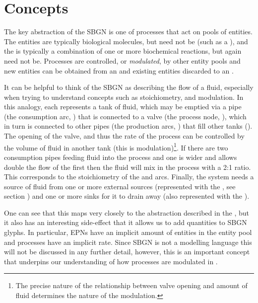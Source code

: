 \section{Concepts}
\label{sec:concepts}

The key abstraction of the SBGN \PDl is one of  processes that act on pools of entities. The entities are typically biological molecules, but need not be (such as a ), and the  is typically a combination of one or more  biochemical reactions, but again need not be.
Processes are controlled, or \emph{modulated}, by other entity pools and new entities can be obtained from an  and existing entities discarded to an .

It can be helpful to think of the SBGN \PD as describing the flow of a fluid, especially when trying to understand concepts such as stoichiometry, and modulation. In this analogy, each  represents a tank of fluid, which may be emptied via a pipe (the consumption arc, ) that is connected to a valve (the process node, ), which in turn is connected to other pipes (the production arcs, ) that fill other tanks (). The opening of the valve, and thus the rate of the process can be controlled by the volume of fluid in another tank (this is modulation)\footnote{The precise nature of the relationship between valve opening and amount of fluid determines the nature of the modulation.}. If there are two consumption pipes feeding fluid into the process and one is wider and allows double the flow of the first then the fluid will mix in the process with a 2:1 ratio. This corresponds to the stoichiometry of the  and  arcs. Finally, the system needs a source of fluid from one or more external sources (represented with the , see section ) and one or more sinks for it to drain away (also represented with the ).

One can see that this maps very closely to the abstraction described in the \PDl, but it also has an interesting side-effect that it allows us to add quantities to SBGN glyphs. In particular, EPNs have an implicit amount of entities in the entity pool and processes have an implicit rate. Since SBGN \PD is not a modelling language this will not be discussed in any further detail, however, this is an important concept that underpins our understanding of how processes are modulated in .

